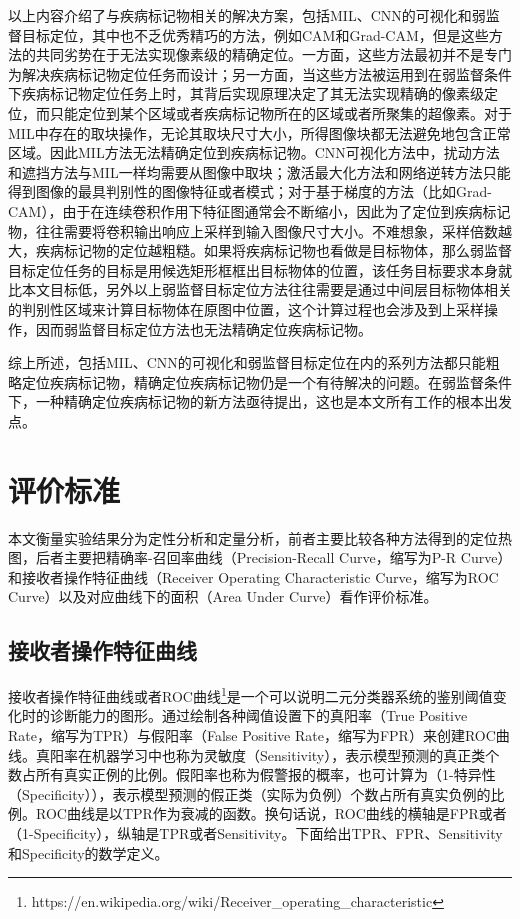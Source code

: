 以上内容介绍了与疾病标记物相关的解决方案，包括MIL、CNN的可视化和弱监督目标定位，其中也不乏优秀精巧的方法，例如CAM和Grad-CAM，但是这些方法的共同劣势在于无法实现像素级的精确定位。一方面，这些方法最初并不是专门为解决疾病标记物定位任务而设计；另一方面，当这些方法被运用到在弱监督条件下疾病标记物定位任务上时，其背后实现原理决定了其无法实现精确的像素级定位，而只能定位到某个区域或者疾病标记物所在的区域或者所聚集的超像素。对于MIL中存在的取块操作，无论其取块尺寸大小，所得图像块都无法避免地包含正常区域。因此MIL方法无法精确定位到疾病标记物。CNN可视化方法中，扰动方法和遮挡方法与MIL一样均需要从图像中取块；激活最大化方法和网络逆转方法只能得到图像的最具判别性的图像特征或者模式；对于基于梯度的方法（比如Grad-CAM），由于在连续卷积作用下特征图通常会不断缩小，因此为了定位到疾病标记物，往往需要将卷积输出响应上采样到输入图像尺寸大小。不难想象，采样倍数越大，疾病标记物的定位越粗糙。如果将疾病标记物也看做是目标物体，那么弱监督目标定位任务的目标是用候选矩形框框出目标物体的位置，该任务目标要求本身就比本文目标低，另外以上弱监督目标定位方法往往需要是通过中间层目标物体相关的判别性区域来计算目标物体在原图中位置，这个计算过程也会涉及到上采样操作，因而弱监督目标定位方法也无法精确定位疾病标记物。

综上所述，包括MIL、CNN的可视化和弱监督目标定位在内的系列方法都只能粗略定位疾病标记物，精确定位疾病标记物仍是一个有待解决的问题。在弱监督条件下，一种精确定位疾病标记物的新方法亟待提出，这也是本文所有工作的根本出发点。
\section{评价标准}\label{sec:evaluation_metrics}
本文衡量实验结果分为定性分析和定量分析，前者主要比较各种方法得到的定位热图，后者主要把精确率-召回率曲线（Precision-Recall Curve，缩写为P-R Curve）和接收者操作特征曲线（Receiver Operating Characteristic Curve，缩写为ROC Curve）以及对应曲线下的面积（Area Under Curve）看作评价标准。
\subsection{接收者操作特征曲线}\label{subsec:roc_curve}
接收者操作特征曲线或者ROC曲线\footnote{https://en.wikipedia.org/wiki/Receiver\_operating\_characteristic}是一个可以说明二元分类器系统的鉴别阈值变化时的诊断能力的图形。通过绘制各种阈值设置下的真阳率（True Positive Rate，缩写为TPR）与假阳率（False Positive Rate，缩写为FPR）来创建ROC曲线。真阳率在机器学习中也称为灵敏度（Sensitivity），表示模型预测的真正类个数占所有真实正例的比例。假阳率也称为假警报的概率，也可计算为（1-特异性（Specificity）），表示模型预测的假正类（实际为负例）个数占所有真实负例的比例。ROC曲线是以TPR作为衰减的函数。换句话说，ROC曲线的横轴是FPR或者（1-Specificity），纵轴是TPR或者Sensitivity。下面给出TPR、FPR、Sensitivity和Specificity的数学定义。

